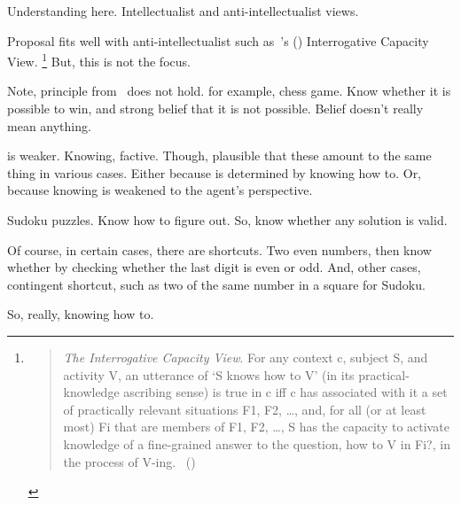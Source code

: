 \begin{note}
  Understanding here.
  Intellectualist and anti-intellectualist views.

  Proposal fits well with anti-intellectualist such as~\citeauthor{Habgood-Coote:2019we}'s (\citeyear{Habgood-Coote:2019we}) Interrogative Capacity View.%
  \footnote{
    \begin{quote}
      \emph{The Interrogative Capacity View}.
      For any context c, subject S, and activity V, an utterance of `S knows how to V' (in its practical-knowledge ascribing sense) is true in c iff c has associated with it a set of practically relevant situations {F1, F2, \dots}, and, for all (or at least most) Fi that are members of {F1, F2, \dots}, S has the capacity to activate knowledge of a ﬁne-grained answer to the question, how to V in Fi?, in the process of V-ing.%
      \mbox{ }\hfill\mbox{(\citeyear[92]{Habgood-Coote:2019we})}
    \end{quote}
  }
  But, this is not the focus.
  
\end{note}

\begin{note}
  Note, principle from~\cite{Barker:1975un} does not hold.
  for example, chess game.
  Know whether it is possible to win, and strong belief that it is not possible.
  Belief doesn't really mean anything.
\end{note}


\begin{note}
   is weaker.
  Knowing, factive.
  Though, plausible that these amount to the same thing in various cases.
  Either because \fc{} is determined by knowing how to.
  Or, because knowing is weakened to the agent's perspective.

  Sudoku puzzles.
  Know how to figure out.
  So, know whether any solution is valid.

  Of course, in certain cases, there are shortcuts.
  Two even numbers, then know whether by checking whether the last digit is even or odd.
  And, other cases, contingent shortcut, such as two of the same number in a square for Sudoku.

  So, really, knowing how to.
\end{note}

